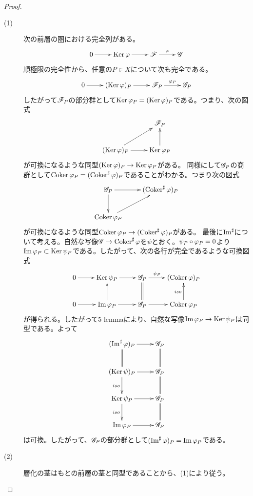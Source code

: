 \begin{proof} ${}$
  \begin{description}
    \item[(1)]
    次の前層の圏における完全列がある。
      \[
      \xymatrix{
      0 \ar[r] & \Ker \vp \ar[r] & \scrf \ar[r]^-{\vp} & \scrg
      }
      \]
      順極限の完全性から、任意の$P \in X$について次も完全である。
      \[
      \xymatrix{
      0 \ar[r] & (\Ker \vp)_P \ar[r]  & \scrf_P \ar[r]^-{\vp_P}  & \scrg_P
      }
      \]
      したがって$\mathscr{F}_P$の部分群として$\operatorname{Ker} {\varphi}_P = (\operatorname{Ker} {\varphi})_P$である。つまり、次の図式
    \[
    \xymatrix{
    {} & \scrf_P \\
    (\Ker \vp)_P \ar[ru] \ar[r]  & \Ker \vp_P \ar[u]
    }
    \]
    が可換になるような同型$(\operatorname{Ker} {\varphi} )_P \to \operatorname{Ker} {\varphi}_P$がある。
      同様にして$\mathscr{G}_P$の商群として$\operatorname{Coker} {\varphi}_P = (\operatorname{Coker}^{\sharp} {\varphi})_P$であることがわかる。つまり次の図式
\[
\xymatrix{
\scrg_P \ar[r] \ar[d] & (\Coker^{\sh} \vp)_P \\
\Coker \vp_P \ar[ru]  &
}
\]
が可換になるような同型$\operatorname{Coker} {\varphi}_P \to (\operatorname{Coker}^{\sharp} {\varphi})_P$がある。
      最後に$\operatorname{Im}^{\sharp}$について考える。自然な写像$\mathscr{G} \to \operatorname{Coker}^{\sharp} {\varphi}$を$\psi$とおく。$\psi_P \circ {\varphi}_P = 0$より$\operatorname{Im} {\varphi}_P \subset \operatorname{Ker} \psi_P$である。したがって、次の各行が完全であるような可換図式
      \[
      \xymatrix{
0 \ar[r] & \Ker \psi_P \ar[r] & \scrg_P \ar[r]^-{\psi_P} \ar@{=}[d] & (\Coker \vp)_P \\
0 \ar[r] & \Im \vp_P \ar[u] \ar[r]  & \scrg_P \ar[r] & \Coker \vp_P \ar[u]^-{iso}
      }
      \]
      が得られる。したがって5-lemmaにより、自然な写像$\operatorname{Im} {\varphi}_P \to \operatorname{Ker} \psi_P$は同型である。よって
\[
\xymatrix{
(\Im^{\sh} \vp)_P \ar[r]  \ar@{=}[d] & \scrg_P \ar@{=}[d] \\
(\Ker \psi)_P \ar[r]  \ar[d]_-{iso} & \scrg_P \ar@{=}[d] \\
\Ker \psi_P \ar[r]  \ar[d]_-{iso} & \scrg_P \ar@{=}[d] \\
\Im \vp_P \ar[r]   & \scrg_P
}
\]
  は可換。したがって、$\mathscr{G}_P$の部分群として$(\operatorname{Im}^{\sharp} {\varphi})_P = \operatorname{Im} {\varphi}_P$である。
      \item[(2)] 層化の茎はもとの前層の茎と同型であることから、(1)により従う。
  \end{description}
\end{proof}



